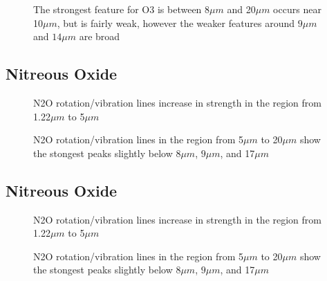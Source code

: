 \documentclass[12pt]{article}
\begin{document}
\vspace*{11.5cm}
\begin{figure}[htb]
\caption{The strongest feature for O3 is between $8 \mu m$ and 20$\mu m$
occurs near 10$\mu m$, but is fairly weak, however the
weaker features around $9 \mu m$ and $ 14\mu m$ are broad}
\end{figure}
\newpage

\subsection{Nitreous Oxide}


\vspace*{11.5cm}
\begin{figure}[htb]
\caption{N2O rotation/vibration lines increase in strength in the region from
 1.22$\mu m$ to 5$\mu m$}
\end{figure}
\newpage

\vspace*{11.5cm}
\begin{figure}[htb]
\caption{N2O rotation/vibration lines in  the region from
 5$\mu m$ to 20$\mu m$ show the stongest peaks  slightly
below $8 \mu m$, $9\mu m$,  and 17$\mu m$}
\end{figure}
\newpage

\subsection{Nitreous Oxide}


\vspace*{11.5cm}
\begin{figure}[htb]
\caption{N2O rotation/vibration lines increase in strength in the region from
 1.22$\mu m$ to 5$\mu m$}
\end{figure}
\newpage

\vspace*{11.5cm}
\begin{figure}[htb]
\caption{N2O rotation/vibration lines in  the region from
 5$\mu m$ to 20$\mu m$ show the stongest peaks  slightly
below $8 \mu m$, $9\mu m$,  and 17$\mu m$}
\end{figure}
\newpage
\end{document}
